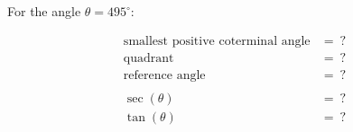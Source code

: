 For the angle $\theta = 495^{\circ}$:

$$
\begin{align*}
  \text{smallest positive coterminal angle} &=\ ? \\
  \text{quadrant} &=\ ? \\
  \text{reference angle} &=\ ? \\
  \\
  \sec(\theta) &=\ ? \\
  \tan(\theta) &=\ ?
\end{align*}
$$
